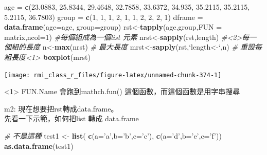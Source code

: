\documentclass[]{book}
\newenvironment{Shaded}{\begin{snugshade}}{\end{snugshade}}
\newcommand{\CommentTok}[1]{\textcolor[rgb]{0.56,0.35,0.01}{\textit{#1}}}
\newcommand{\DataTypeTok}[1]{\textcolor[rgb]{0.13,0.29,0.53}{#1}}
\newcommand{\DecValTok}[1]{\textcolor[rgb]{0.00,0.00,0.81}{#1}}
\newcommand{\FloatTok}[1]{\textcolor[rgb]{0.00,0.00,0.81}{#1}}
\newcommand{\KeywordTok}[1]{\textcolor[rgb]{0.13,0.29,0.53}{\textbf{#1}}}
\newcommand{\NormalTok}[1]{#1}
\newcommand{\StringTok}[1]{\textcolor[rgb]{0.31,0.60,0.02}{#1}}
\theoremstyle{definition}
\theoremstyle{definition}
\theoremstyle{definition}
\theoremstyle{remark}
\begin{document}
\begin{Shaded}
\begin{Highlighting}[]
\NormalTok{age    =}\StringTok{ }\KeywordTok{c}\NormalTok{(}\FloatTok{23.0883}\NormalTok{, }\FloatTok{25.8344}\NormalTok{, }\FloatTok{29.4648}\NormalTok{, }\FloatTok{32.7858}\NormalTok{, }\FloatTok{33.6372}\NormalTok{,}
           \FloatTok{34.935}\NormalTok{,  }\FloatTok{35.2115}\NormalTok{, }\FloatTok{35.2115}\NormalTok{,  }\FloatTok{5.2115}\NormalTok{, }\FloatTok{36.7803}\NormalTok{)}
\NormalTok{group  =}\StringTok{ }\KeywordTok{c}\NormalTok{(}\DecValTok{1}\NormalTok{, }\DecValTok{1}\NormalTok{, }\DecValTok{1}\NormalTok{, }\DecValTok{2}\NormalTok{, }\DecValTok{1}\NormalTok{, }\DecValTok{1}\NormalTok{, }\DecValTok{2}\NormalTok{, }\DecValTok{2}\NormalTok{, }\DecValTok{2}\NormalTok{, }\DecValTok{1}\NormalTok{)}
\NormalTok{dframe =}\StringTok{ }\KeywordTok{data.frame}\NormalTok{(}\DataTypeTok{age=}\NormalTok{age, }\DataTypeTok{group=}\NormalTok{group)}
\NormalTok{rst<-}\KeywordTok{tapply}\NormalTok{(age,group,}\DataTypeTok{FUN =}\NormalTok{ matrix,}\DataTypeTok{ncol=}\DecValTok{1}\NormalTok{) }\CommentTok{#每個組成為一個list 元素}
\NormalTok{nrst<-}\KeywordTok{sapply}\NormalTok{(rst,length) }\CommentTok{#<2>每一個組的長度}
\NormalTok{n<-}\KeywordTok{max}\NormalTok{(nrst)  }\CommentTok{# 最大長度}
\NormalTok{mrst<-}\KeywordTok{sapply}\NormalTok{(rst,}\StringTok{`}\DataTypeTok{length<-}\StringTok{`}\NormalTok{,n) }\CommentTok{# 重設每組長度<1>}
\KeywordTok{boxplot}\NormalTok{(mrst)}
\end{Highlighting}
\end{Shaded}

\begin{center}\texttt{[image: rmi\_class\_r\_files/figure-latex/unnamed-chunk-374-1]} \end{center}

\textless{}1\textgreater{} FUN.Name 會跑到mathch.fun()
這個函數，而這個函數是用字串搜尋

m2: 現在想要把rst轉成data.frame。\\
先看一下示範，如何把list 轉成 data.frame

\begin{Shaded}
\begin{Highlighting}[]
\CommentTok{# 不是這種}
\NormalTok{test1 <-}\StringTok{ }\KeywordTok{list}\NormalTok{( }\KeywordTok{c}\NormalTok{(}\DataTypeTok{a=}\StringTok{'a'}\NormalTok{,}\DataTypeTok{b=}\StringTok{'b'}\NormalTok{,}\DataTypeTok{c=}\StringTok{'c'}\NormalTok{), }
               \KeywordTok{c}\NormalTok{(}\DataTypeTok{a=}\StringTok{'d'}\NormalTok{,}\DataTypeTok{b=}\StringTok{'e'}\NormalTok{,}\DataTypeTok{c=}\StringTok{'f'}\NormalTok{))}
\KeywordTok{as.data.frame}\NormalTok{(test1)}
\end{Highlighting}
\end{Shaded}
\end{document}
